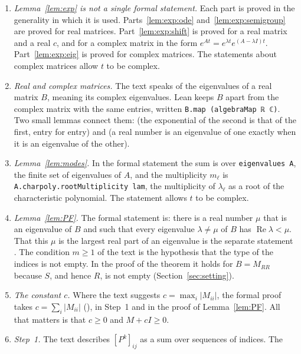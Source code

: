 \documentclass[11pt]{article}
\theoremstyle{definition}
\theoremstyle{remark}
\renewcommand{\Re}{\operatorname{Re}}
\begin{document}
\begin{enumerate}[label=\textup{\arabic*.}, leftmargin=2em]
  \item \emph{Lemma~\ref{lem:exp} is not a single formal statement.} Each part is proved in the
        generality in which it is used. Parts~\ref{lem:exp:ode} and~\ref{lem:exp:semigroup} are
        proved for real matrices. Part~\ref{lem:exp:shift} is proved for a real matrix and a real
        $c$, and for a complex matrix in the form
        $e^{At} = e^{\lambda t} e^{(A - \lambda I)t}$. Part~\ref{lem:exp:eig} is proved for
        complex matrices. The statements about complex matrices allow $t$ to be complex.
  \item \emph{Real and complex matrices.} The text speaks of the eigenvalues of a real matrix
        $B$, meaning its complex eigenvalues. Lean keeps $B$ apart from the complex matrix with
        the same entries, written \verb|B.map (algebraMap ℝ ℂ)|. Two small lemmas connect them:
         (the exponential of the second is that of the first, entry
        for entry) and  (a real number is an eigenvalue of one
        exactly when it is an eigenvalue of the other).
  \item \emph{Lemma~\ref{lem:modes}.} In the formal statement the sum is over
        \verb|eigenvalues A|, the finite set of eigenvalues of $A$, and the multiplicity $m_\ell$
        is \verb|A.charpoly.rootMultiplicity lam|, the multiplicity of $\lambda_\ell$ as a root
        of the characteristic polynomial. The statement allows $t$ to be complex.
  \item \emph{Lemma~\ref{lem:PF}.} The formal statement is: there is a real number $\mu$ that is
        an eigenvalue of $B$ and such that every eigenvalue $\lambda \ne \mu$ of $B$ has
        $\Re\lambda < \mu$. That this $\mu$ is the largest real part of an eigenvalue is the
        separate statement . The condition $m \ge 1$ of the text is
        the hypothesis that the type of the indices is not empty. In the proof of the theorem it
        holds for $B = M_{RR}$ because $S$, and hence $R$, is not empty
        (Section~\ref{sec:setting}).
  \item \emph{The constant $c$.} Where the text suggests $c = \max_i |M_{ii}|$, the formal proof
        takes $c = \sum_i |M_{ii}|$ (), in Step~1 and in the proof of
        Lemma~\ref{lem:PF}. All that matters is that $c \ge 0$ and $M + cI \ge 0$.
  \item \emph{Step~1.} The text describes $[P^k]_{ij}$ as a sum over sequences of indices. The

\end{enumerate}
\end{document}
